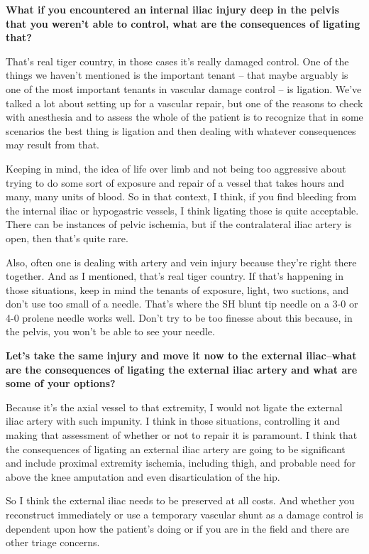 \documentclass[
]{book}
\begin{document}
\textbf{What if you encountered an internal iliac injury deep in the pelvis
that you weren't able to control, what are the consequences of ligating
that?}

That's real tiger country, in those cases it's really damaged control.
One of the things we haven't mentioned is the important tenant -- that
maybe arguably is one of the most important tenants in vascular damage
control -- is ligation. We've talked a lot about setting up for a
vascular repair, but one of the reasons to check with anesthesia and to
assess the whole of the patient is to recognize that in some scenarios
the best thing is ligation and then dealing with whatever consequences
may result from that.

Keeping in mind, the idea of life over limb and not being too aggressive
about trying to do some sort of exposure and repair of a vessel that
takes hours and many, many units of blood. So in that context, I think,
if you find bleeding from the internal iliac or hypogastric vessels, I
think ligating those is quite acceptable. There can be instances of
pelvic ischemia, but if the contralateral iliac artery is open, then
that's quite rare.

Also, often one is dealing with artery and vein injury because they're
right there together. And as I mentioned, that's real tiger country. If
that's happening in those situations, keep in mind the tenants of
exposure, light, two suctions, and don't use too small of a needle.
That's where the SH blunt tip needle on a 3-0 or 4-0 prolene needle
works well. Don't try to be too finesse about this because, in the
pelvis, you won't be able to see your needle.

\textbf{Let's take the same injury and move it now to the external iliac--what
are the consequences of ligating the external iliac artery and what are
some of your options?}

Because it's the axial vessel to that extremity, I would not ligate the
external iliac artery with such impunity. I think in those situations,
controlling it and making that assessment of whether or not to repair it
is paramount. I think that the consequences of ligating an external
iliac artery are going to be significant and include proximal extremity
ischemia, including thigh, and probable need for above the knee
amputation and even disarticulation of the hip.

So I think the external iliac needs to be preserved at all costs. And
whether you reconstruct immediately or use a temporary vascular shunt as
a damage control is dependent upon how the patient's doing or if you are
in the field and there are other triage concerns.
\end{document}
